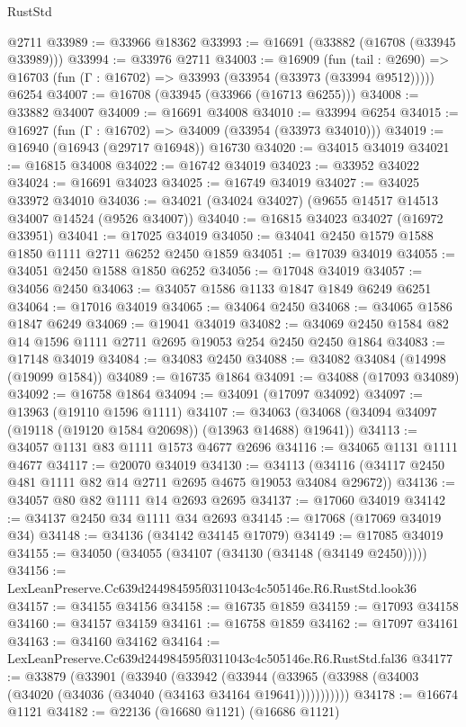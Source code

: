 \begin{lexlean}{RustStd}
\begin{coremodule}
    @2711
@33989 := @33966 @18362
@33993 := @16691 (@33882 (@16708 (@33945 @33989)))
@33994 := @33976 @2711
@34003 := @16909
    (fun (tail : @2690) => @16703 (fun (Γ : @16702) => @33993 (@33954 (@33973 (@33994 @9512)))))
    @6254
@34007 := @16708 (@33945 (@33966 (@16713 @6255)))
@34008 := @33882 @34007
@34009 := @16691 @34008
@34010 := @33994 @6254
@34015 := @16927 (fun (Γ : @16702) => @34009 (@33954 (@33973 @34010)))
@34019 := @16940 (@16943 (@29717 @16948)) @16730
@34020 := @34015 @34019
@34021 := @16815 @34008
@34022 := @16742 @34019
@34023 := @33952 @34022
@34024 := @16691 @34023
@34025 := @16749 @34019
@34027 := @34025 @33972 @34010
@34036 := @34021 (@34024 @34027) (@9655 @14517 @14513 @34007 @14524 (@9526 @34007))
@34040 := @16815 @34023 @34027 (@16972 @33951)
@34041 := @17025 @34019
@34050 := @34041 @2450 @1579 @1588 @1850 @1111 @2711 @6252 @2450 @1859
@34051 := @17039 @34019
@34055 := @34051 @2450 @1588 @1850 @6252
@34056 := @17048 @34019
@34057 := @34056 @2450
@34063 := @34057 @1586 @1133 @1847 @1849 @6249 @6251
@34064 := @17016 @34019
@34065 := @34064 @2450
@34068 := @34065 @1586 @1847 @6249
@34069 := @19041 @34019
@34082 := @34069 @2450 @1584 @82 @14 @1596 @1111 @2711 @2695 @19053 @254 @2450 @2450 @1864
@34083 := @17148 @34019
@34084 := @34083 @2450
@34088 := @34082 @34084 (@14998 (@19099 @1584))
@34089 := @16735 @1864
@34091 := @34088 (@17093 @34089)
@34092 := @16758 @1864
@34094 := @34091 (@17097 @34092)
@34097 := @13963 (@19110 @1596 @1111)
@34107 := @34063 (@34068 (@34094 @34097 (@19118 (@19120 @1584 @20698)) (@13963 @14688) @19641))
@34113 := @34057 @1131 @83 @1111 @1573 @4677 @2696
@34116 := @34065 @1131 @1111 @4677
@34117 := @20070 @34019
@34130 := @34113 (@34116 (@34117 @2450 @481 @1111 @82 @14 @2711 @2695 @4675 @19053 @34084 @29672))
@34136 := @34057 @80 @82 @1111 @14 @2693 @2695
@34137 := @17060 @34019
@34142 := @34137 @2450 @34 @1111 @34 @2693
@34145 := @17068 (@17069 @34019 @34)
@34148 := @34136 (@34142 @34145 @17079)
@34149 := @17085 @34019
@34155 := @34050 (@34055 (@34107 (@34130 (@34148 (@34149 @2450)))))
@34156 := LexLeanPreserve.Cc639d244984595f0311043c4c505146e.R6.RustStd.look36
@34157 := @34155 @34156
@34158 := @16735 @1859
@34159 := @17093 @34158
@34160 := @34157 @34159
@34161 := @16758 @1859
@34162 := @17097 @34161
@34163 := @34160 @34162
@34164 := LexLeanPreserve.Cc639d244984595f0311043c4c505146e.R6.RustStd.fal36
@34177 := @33879
    (@33901
      (@33940
        (@33942
          (@33944 (@33965 (@33988 (@34003 (@34020 (@34036 (@34040 (@34163 @34164 @19641)))))))))))
@34178 := @16674 @1121
@34182 := @22136 (@16680 @1121) (@16686 @1121)

\end{coremodule}
\end{lexlean}
